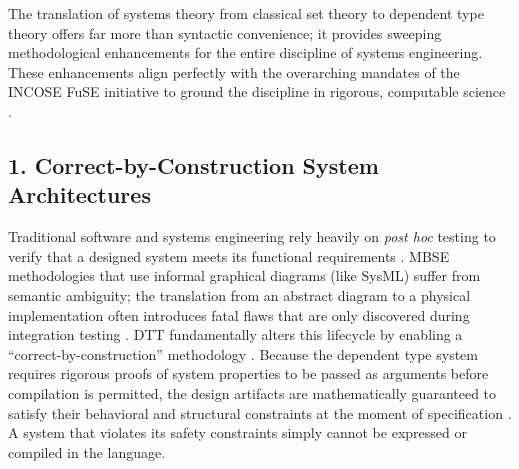 \documentclass[11pt]{article}
\begin{document}
The translation of systems theory from classical set theory to dependent type theory offers far more than syntactic convenience; it provides sweeping methodological enhancements for the entire discipline of systems engineering. These enhancements align perfectly with the overarching mandates of the INCOSE FuSE initiative to ground the discipline in rigorous, computable science \parencite{Ref8, Ref9}.\subsection{1. Correct-by-Construction System Architectures}
Traditional software and systems engineering rely heavily on \textit{post hoc} testing to verify that a designed system meets its functional requirements \parencite{Ref41, Ref42}. MBSE methodologies that use informal graphical diagrams (like SysML) suffer from semantic ambiguity; the translation from an abstract diagram to a physical implementation often introduces fatal flaws that are only discovered during integration testing \parencite{Ref4, Ref43}. DTT fundamentally alters this lifecycle by enabling a ``correct-by-construction'' methodology \parencite{Ref6, Ref39, Ref40}. Because the dependent type system requires rigorous proofs of system properties to be passed as arguments before compilation is permitted, the design artifacts are mathematically guaranteed to satisfy their behavioral and structural constraints at the moment of specification \parencite{Ref22, Ref27}. A system that violates its safety constraints simply cannot be expressed or compiled in the language.
\end{document}
